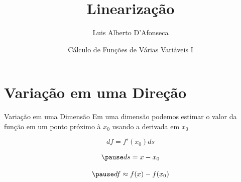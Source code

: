 
\usepackage{apresentacao}
\usepackage{mathconfig}
\usepackage{tabto}


\setcounter{exemplo}{0}

\makeatletter
\graphicspath  {{./figs/}}
\makeatother

\newcommand{\D}[2]{\dfrac{\partial {#1}}{\partial {#2}}}
\newcommand{\DS}[2]{\frac{\partial^2 {#1}}{\partial {#2}^2}}
\newcommand{\DM}[3]{\frac{\partial^2 {#1}}{\partial {#2} \partial {#3}}}

\newcommand{\vetor}[2]{\left(\begin{array}{c} #1 \\ #2 \end{array}\right)}

\newcommand{\veci}{\bm{i}}
\newcommand{\vecj}{\bm{j}}
\newcommand{\veck}{\bm{k}}

\title {Linearização}
\author{\large Luis Alberto D'Afonseca}
\date  {Cálculo de Funções de Várias Variáveis I}



\begin{frame}
    \titlepage
\end{frame}

\section{Variação em uma Direção}


\begin{frame}{Variação em uma Dimensão}
  Em uma dimensão podemos estimar o valor da função em um ponto próximo à $x_0$
  usando a derivada em $x_0$

  \pause
  \[
    df = f'(x_0) ds
  \]

  \[
    \pause
    ds = x - x_0
  \]

  \[
    \pause
    df \approx f(x) - f(x_0)
  \]
\end{frame}


